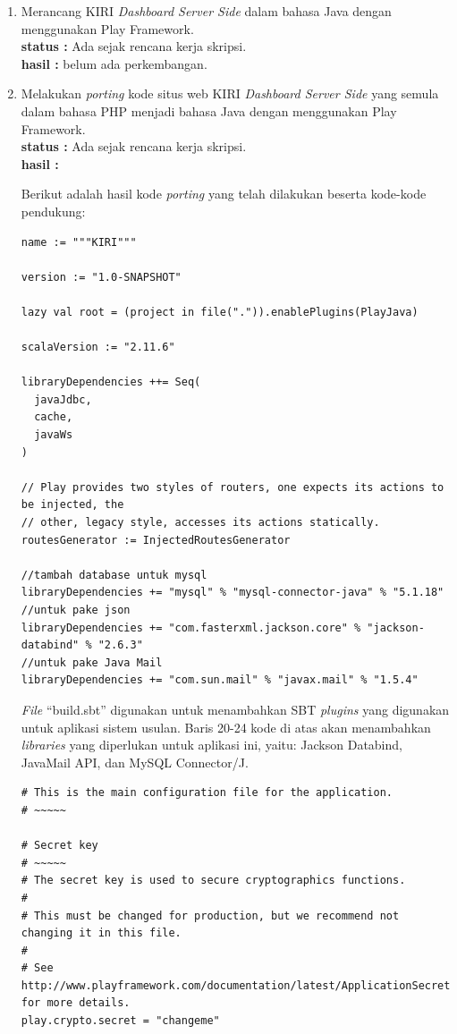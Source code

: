 \documentclass[a4paper,twoside]{article}
\begin{document}
\begin{enumerate}
		\item Merancang KIRI \textit{Dashboard Server Side} dalam bahasa Java dengan menggunakan Play Framework.\\
		{\bf status :} Ada sejak rencana kerja skripsi.\\
		{\bf hasil :} belum ada perkembangan.

		\item Melakukan \textit{porting} kode situs web KIRI \textit{Dashboard Server Side} yang semula dalam bahasa PHP menjadi bahasa Java dengan menggunakan Play Framework.\\
		{\bf status :} Ada sejak rencana kerja skripsi.\\
		{\bf hasil :}
		
		Berikut adalah hasil kode \textit{porting} yang telah dilakukan beserta kode-kode pendukung:
		
\begin{lstlisting}[caption=build.sbt,label={lst:build.sbt}]
name := """KIRI"""

version := "1.0-SNAPSHOT"

lazy val root = (project in file(".")).enablePlugins(PlayJava)

scalaVersion := "2.11.6"

libraryDependencies ++= Seq(
  javaJdbc,
  cache,
  javaWs
)

// Play provides two styles of routers, one expects its actions to be injected, the
// other, legacy style, accesses its actions statically.
routesGenerator := InjectedRoutesGenerator

//tambah database untuk mysql
libraryDependencies += "mysql" % "mysql-connector-java" % "5.1.18"
//untuk pake json
libraryDependencies += "com.fasterxml.jackson.core" % "jackson-databind" % "2.6.3"
//untuk pake Java Mail
libraryDependencies += "com.sun.mail" % "javax.mail" % "1.5.4"
\end{lstlisting}

\textit{File} ``build.sbt'' digunakan untuk menambahkan SBT \textit{plugins} yang digunakan untuk aplikasi sistem usulan. Baris 20-24 kode di atas akan menambahkan \textit{libraries} yang diperlukan untuk aplikasi ini, yaitu: Jackson Databind, JavaMail API, dan MySQL Connector/J.

\begin{lstlisting}[caption=application.conf,label={lst:application.conf}]
# This is the main configuration file for the application.
# ~~~~~

# Secret key
# ~~~~~
# The secret key is used to secure cryptographics functions.
#
# This must be changed for production, but we recommend not changing it in this file.
#
# See http://www.playframework.com/documentation/latest/ApplicationSecret for more details.
play.crypto.secret = "changeme"


\end{lstlisting}
\end{enumerate}
\end{document}

